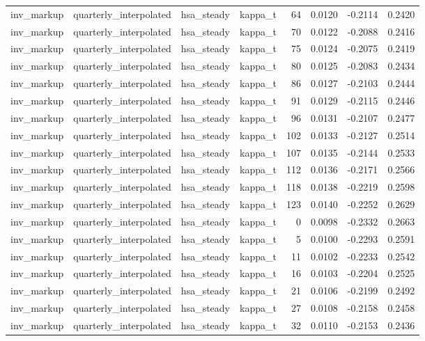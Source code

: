 \begin{tabular}{llllrrrr}
inv\_markup & quarterly\_interpolated & hsa\_steady & kappa\_t & 64 & 0.0120 & -0.2114 & 0.2420 \\
inv\_markup & quarterly\_interpolated & hsa\_steady & kappa\_t & 70 & 0.0122 & -0.2088 & 0.2416 \\
inv\_markup & quarterly\_interpolated & hsa\_steady & kappa\_t & 75 & 0.0124 & -0.2075 & 0.2419 \\
inv\_markup & quarterly\_interpolated & hsa\_steady & kappa\_t & 80 & 0.0125 & -0.2083 & 0.2434 \\
inv\_markup & quarterly\_interpolated & hsa\_steady & kappa\_t & 86 & 0.0127 & -0.2103 & 0.2444 \\
inv\_markup & quarterly\_interpolated & hsa\_steady & kappa\_t & 91 & 0.0129 & -0.2115 & 0.2446 \\
inv\_markup & quarterly\_interpolated & hsa\_steady & kappa\_t & 96 & 0.0131 & -0.2107 & 0.2477 \\
inv\_markup & quarterly\_interpolated & hsa\_steady & kappa\_t & 102 & 0.0133 & -0.2127 & 0.2514 \\
inv\_markup & quarterly\_interpolated & hsa\_steady & kappa\_t & 107 & 0.0135 & -0.2144 & 0.2533 \\
inv\_markup & quarterly\_interpolated & hsa\_steady & kappa\_t & 112 & 0.0136 & -0.2171 & 0.2566 \\
inv\_markup & quarterly\_interpolated & hsa\_steady & kappa\_t & 118 & 0.0138 & -0.2219 & 0.2598 \\
inv\_markup & quarterly\_interpolated & hsa\_steady & kappa\_t & 123 & 0.0140 & -0.2252 & 0.2629 \\
inv\_markup & quarterly\_interpolated & hsa\_steady & kappa\_t & 0 & 0.0098 & -0.2332 & 0.2663 \\
inv\_markup & quarterly\_interpolated & hsa\_steady & kappa\_t & 5 & 0.0100 & -0.2293 & 0.2591 \\
inv\_markup & quarterly\_interpolated & hsa\_steady & kappa\_t & 11 & 0.0102 & -0.2233 & 0.2542 \\
inv\_markup & quarterly\_interpolated & hsa\_steady & kappa\_t & 16 & 0.0103 & -0.2204 & 0.2525 \\
inv\_markup & quarterly\_interpolated & hsa\_steady & kappa\_t & 21 & 0.0106 & -0.2199 & 0.2492 \\
inv\_markup & quarterly\_interpolated & hsa\_steady & kappa\_t & 27 & 0.0108 & -0.2158 & 0.2458 \\
inv\_markup & quarterly\_interpolated & hsa\_steady & kappa\_t & 32 & 0.0110 & -0.2153 & 0.2436 \\

\end{tabular}
